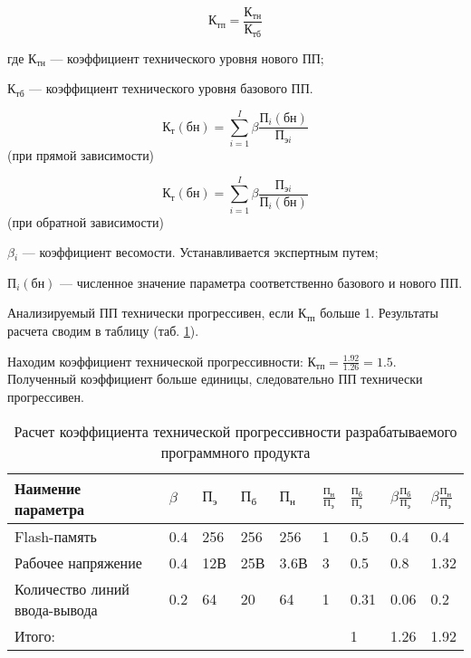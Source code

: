 \begin{equation}
К_{тп} = \frac{К_{тн}}{К_{тб}}
\end{equation}
\begin{ESKDexplanation}
	\item[где ]{} $К_{тн}$ --- коэффициент технического уровня нового ПП;
	\item{} $К_{тб}$ --- коэффициент технического уровня базового ПП.
\end{ESKDexplanation}

\begin{equation}
	К_{т}{(бн)} = \sum_{i=1}^{I}\beta{}\frac{П_i{(бн)}}{{П}_{эi}}
\end{equation}
(при прямой зависимости)

\begin{equation}
	К_{т}{(бн)} = \sum_{i=1}^{I}\beta{}\frac{П_{э i}}{П_{i}{(бн)}}
\end{equation}
(при обратной зависимости)
\begin{ESKDexplanation}
	\item{} $\beta{}_i$ --- коэффициент весомости. Устанавливается экспертным путем;
	\item{} $П_i{(бн)}$ --- численное значение параметра соответственно базового и нового ПП.
\end{ESKDexplanation}


Анализируемый ПП технически прогрессивен, если $\textrm{К}_\textrm{тп}$ больше 1. Результаты
расчета сводим в таблицу (таб. \ref{table:calcKoefTechProgress}).

Находим коэффициент технической прогрессивности: $К_{тп} = \frac{1.92}{1.26} = 1.5$.
Полученный коэффициент больше единицы, следовательно ПП технически прогрессивен.
\begin{table}[H]
\caption{Расчет коэффициента технической прогрессивности разрабатываемого программного продукта}
\begin{tabular}{|p{5cm}|p{1cm}|p{1cm}|p{1cm}|p{1cm}|p{1cm}|p{1cm}|p{1cm}|p{1cm}|}
\hline{}
Наимение параметра &
	$\beta $ &
	$П_{э}$ &
	$П_{б}$ &
	$П_{н}$ &
	$\frac{П_{н}}{П_{э}}$ &
	$\frac{П_{б}}{П_{э}}$ &
	$\beta \frac{П_{б}}{П_{э}}$ &
	$\beta \frac{П_{н}}{П_{э}}$ \\
\hline{}
Flash-память & 0.4 & 256 & 256 & 256 & 1 & 0.5 & 0.4 & 0.4 \\
\hline{}
Рабочее напряжение & 0.4 & 12В & 25В & 3.6В & 3 & 0.5 & 0.8 & 1.32 \\
\hline{}
Количество линий ввода-вывода & 0.2 & 64 & 20 & 64 & 1 & 0.31 & 0.06 & 0.2 \\
\hline{}
Итого: & & & & & & 1 & 1.26  & 1.92 \\
\hline
\end{tabular}
\label{table:calcKoefTechProgress}
\end{table}


